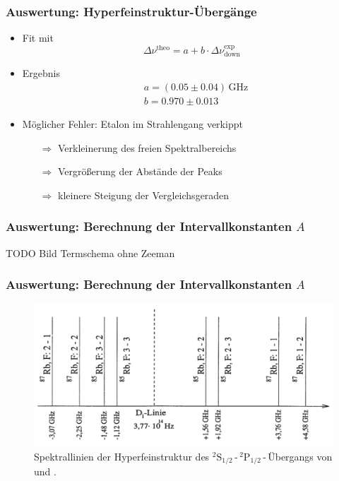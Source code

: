 \begin{frame}
\frametitle{Auswertung: Hyperfeinstruktur-Übergänge}
\begin{itemize}[<+->]
    \item Fit mit
    \begin{equation*}
        \Delta \nu^\text{theo} = a + b \cdot \Delta \nu^\text{exp}_\text{down}
    \end{equation*}
    \item Ergebnis
    \begin{equation*}
        \begin{split}
            & a = (0.05 \pm 0.04)\,\text{GHz} \\
            & b = 0.970 \pm 0.013
        \end{split}
    \end{equation*}
    \item Möglicher Fehler: Etalon im Strahlengang verkippt
    \begin{itemize}[<+->]
        \item[$\Rightarrow$] Verkleinerung des freien Spektralbereichs
        \item[$\Rightarrow$] Vergrößerung der Abstände der Peaks
        \item[$\Rightarrow$] kleinere Steigung der Vergleichsgeraden
    \end{itemize}
\end{itemize}
\end{frame}

\begin{frame}
\frametitle{Auswertung: Berechnung der Intervallkonstanten $A$}
TODO Bild Termschema ohne Zeeman %
\end{frame}

\begin{frame}
\frametitle{Auswertung: Berechnung der Intervallkonstanten $A$}
\begin{figure}
    \centering
    \includegraphics[width=\textwidth]{../img/HFSspect_theo.png}
    \caption{Spektrallinien der Hyperfeinstruktur des ${}^2\text{S}_{1/2}$\,-\,${}^2\text{P}_{1/2}$\,-\,Übergangs
    von  und .}  %
\end{figure}
\end{frame}

